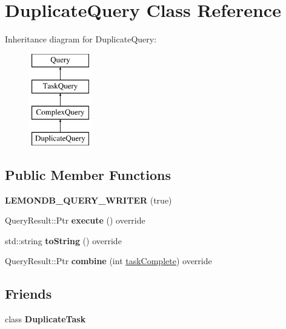 \hypertarget{class_duplicate_query}{}\section{Duplicate\+Query Class Reference}
\label{class_duplicate_query}
Inheritance diagram for Duplicate\+Query\+:\begin{figure}[H]
\begin{center}
\leavevmode
\includegraphics[height=4.000000cm]{class_duplicate_query}
\end{center}
\end{figure}
\subsection*{Public Member Functions}
\begin{DoxyCompactItemize}
\item 
\mbox{\label{class_duplicate_query_ae7356ed3cbffe8ee72ede6a05c542686}} 
{\bfseries L\+E\+M\+O\+N\+D\+B\+\_\+\+Q\+U\+E\+R\+Y\+\_\+\+W\+R\+I\+T\+ER} (true)
\item 
\mbox{\label{class_duplicate_query_ab7ce5d0d57cc839ff330de7e016354b0}} 
Query\+Result\+::\+Ptr {\bfseries execute} () override
\item 
\mbox{\label{class_duplicate_query_af1f379a04b6eb6940e97fe4c33d171a7}} 
std\+::string {\bfseries to\+String} () override
\item 
\mbox{\label{class_duplicate_query_ae3b387fdae8793a92020f2946b6c0086}} 
Query\+Result\+::\+Ptr {\bfseries combine} (int \hyperlink{class_task_query_a3dc3e4c56ddea8ff025239fd9da358d3}{task\+Complete}) override
\end{DoxyCompactItemize}
\subsection*{Friends}
\begin{DoxyCompactItemize}
\item 
\mbox{\label{class_duplicate_query_ac4a27d08853bb2e571fb2d74a3b9be3b}} 
class {\bfseries Duplicate\+Task}
\end{DoxyCompactItemize}
